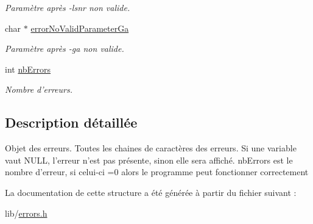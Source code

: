 \begin{DoxyCompactItemize}
\begin{DoxyCompactList}\small\item\em Paramètre après -\/lsnr non valide. \item\end{DoxyCompactList}\item 
\hypertarget{structErrors_aa8fc65c54b7397a4eff642f0416bf533}{
char $\ast$ \hyperlink{structErrors_aa8fc65c54b7397a4eff642f0416bf533}{errorNoValidParameterGa}}
\label{structErrors_aa8fc65c54b7397a4eff642f0416bf533}

\begin{DoxyCompactList}\small\item\em Paramètre après -\/ga non valide. \item\end{DoxyCompactList}\item 
\hypertarget{structErrors_aab575112743341bf554002622a903483}{
int \hyperlink{structErrors_aab575112743341bf554002622a903483}{nbErrors}}
\label{structErrors_aab575112743341bf554002622a903483}

\begin{DoxyCompactList}\small\item\em Nombre d'erreurs. \item\end{DoxyCompactList}\end{DoxyCompactItemize}


\subsection{Description détaillée}
Objet des erreurs. Toutes les chaines de caractères des erreurs. Si une variable vaut NULL, l'erreur n'est pas présente, sinon elle sera affiché. nbErrors est le nombre d'erreur, si celui-\/ci =0 alors le programme peut fonctionner correctement 

La documentation de cette structure a été générée à partir du fichier suivant :\begin{DoxyCompactItemize}
\item 
lib/\hyperlink{errors_8h}{errors.h}\end{DoxyCompactItemize}

